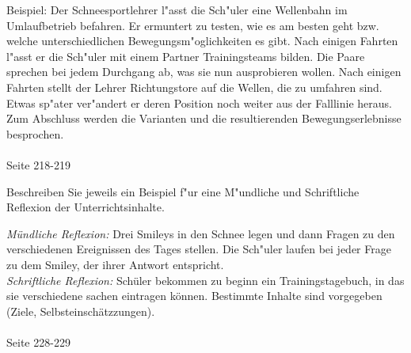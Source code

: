 \begin{solution}
Beispiel: Der Schneesportlehrer l"asst die Sch"uler eine Wellenbahn im Umlaufbetrieb befahren. Er ermuntert zu testen, wie es am besten geht bzw. welche unterschiedlichen Bewegungsm"oglichkeiten es gibt. Nach einigen Fahrten l"asst er die Sch"uler mit einem Partner Trainingsteams bilden. Die Paare sprechen bei jedem Durchgang ab, was sie nun ausprobieren wollen. Nach einigen Fahrten stellt der Lehrer Richtungstore auf die Wellen, die zu umfahren sind. Etwas sp"ater ver"andert er deren Position noch weiter aus der Falllinie heraus. Zum Abschluss werden die Varianten und die resultierenden Bewegungserlebnisse besprochen.\\\\
 Seite 218-219
\end{solution}

\begin{question}{4}
Beschreiben Sie jeweils ein Beispiel f"ur eine M"undliche und Schriftliche Reflexion der Unterrichtsinhalte. 
\end{question}
\begin{solution}
\emph{Mündliche Reflexion:} Drei Smileys in den Schnee legen und dann Fragen zu den verschiedenen Ereignissen des Tages stellen. Die Sch"uler laufen bei jeder Frage zu dem Smiley, der ihrer Antwort entspricht.\\
\emph{Schriftliche Reflexion:} Schüler bekommen zu beginn ein Trainingstagebuch, in das sie verschiedene sachen eintragen können. Bestimmte Inhalte sind vorgegeben (Ziele, Selbsteinschätzzungen).\\\\
 Seite 228-229
\end{solution}

